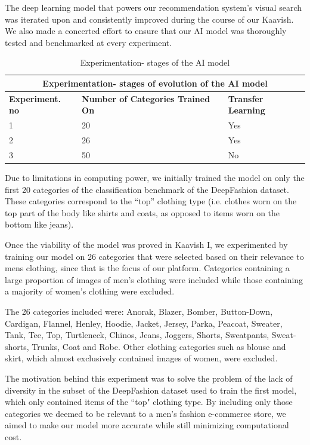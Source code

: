 The deep learning model that powers our recommendation system's visual search was iterated upon and consistently improved during the course of our Kaavish. We also made a concerted effort to ensure that our AI model was thoroughly tested and benchmarked at every experiment.

\begin{table}[H]
\begin{tabular}{ @{}|p{4cm}|p{5cm}|p{5cm}|  }
 \hline
 \multicolumn{3}{|c|}{\textbf{Experimentation- stages of evolution of the AI model}} \\
 \hline
 \textbf{Experiment. no} & \textbf{Number of Categories Trained On} & \textbf{Transfer Learning}\\
 
\hline
 1 & 20 & Yes \\ 
 \hline
 2 & 26 & Yes \\ 
 \hline
  3 & 50 & No \\
 \hline
\end{tabular}
\caption{Experimentation- stages of the AI model}
\label{table:Experimentation- stages of AI model}
\end{table}


Due to limitations in computing power, we initially trained the model on only the first 20 categories of the classification benchmark of the DeepFashion dataset. These categories correspond to the “top” clothing type (i.e. clothes worn on the top part of the body like shirts and coats, as opposed to items worn on the bottom like jeans). 

Once the viability of the model was proved in Kaavish I, we experimented by training our model on 26 categories that were selected based on their relevance to mens clothing, since that is the focus of our platform. Categories containing a large proportion of images of men's clothing were included while those containing a majority of women's clothing were excluded. 

The 26 categories included were: Anorak, Blazer, Bomber, Button-Down, Cardigan, Flannel, Henley, Hoodie, Jacket, Jersey, Parka, Peacoat, Sweater, Tank, Tee, Top, Turtleneck, Chinos, Jeans, Joggers, Shorts, Sweatpants, Sweat-shorts, Trunks, Coat and Robe. Other clothing categories such as blouse and skirt, which almost exclusively contained images of women, were excluded.

The motivation behind this experiment was to solve the problem of the lack of diversity in the subset of the DeepFashion dataset used to train the first model, which only contained items of the ``top" clothing type. By including only those categories we deemed to be relevant to a men’s fashion e-commerce store, we aimed to make our model more accurate while still minimizing computational cost. 

